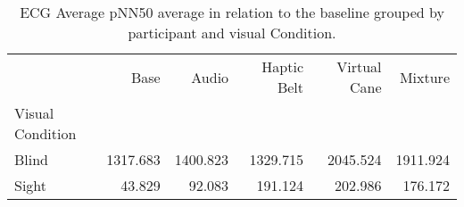 
\begin{table}[!htb]
\centering
\caption{ECG Average pNN50 average in relation to the baseline grouped by participant and visual Condition.}
\label{tab:ecg_pnn50_average_group}
\begin{tabular}{lrrrrr}
\toprule
{} &     Base &    Audio &  Haptic Belt &  Virtual Cane &  Mixture \\
Visual Condition &          &          &              &               &          \\
\midrule
Blind            & 1317.683 & 1400.823 &     1329.715 &      2045.524 & 1911.924 \\
Sight            &   43.829 &   92.083 &      191.124 &       202.986 &  176.172 \\
\bottomrule
\end{tabular}
\end{table}


